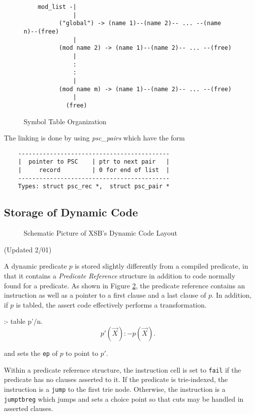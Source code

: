 \documentclass[11pt]{article}
\begin{document}
\begin{figure}
\begin{verbatim}
    mod_list -|
              |
          ("global") -> (name 1)--(name 2)-- ... --(name n)--(free)
              |
          (mod name 2) -> (name 1)--(name 2)-- ... --(free)
              |
              :
              :
              |
          (mod name m) -> (name 1)--(name 2)-- ... --(free)
              |
            (free)
\end{verbatim}
\caption{Symbol Table Organization}
\label{f:pscinmem}
\end{figure}

The linking is done by using {\it psc\_pairs} which have the form

\begin{verbatim}
    -------------------------------------------
    |  pointer to PSC    | ptr to next pair   |
    |     record         | 0 for end of list  |
    -------------------------------------------
    Types: struct psc_rec *,  struct psc_pair *
\end{verbatim}


\subsection{Storage of Dynamic Code}

\begin{figure}[htbp]
\caption{Schematic Picture of XSB's Dynamic Code Layout}
\label{fig:dynamic-code}
\end{figure}

(Updated 2/01)

A dynamic predicate $p$ is stored slightly differently from a compiled
predicate, in that it contains a {\em Predicate Reference} structure
in addition to code normally found for a predicate.  As shown in
Figure \ref{fig:dynamic-code}, the predicate reference contains an
instruction as well as a pointer to a first clause and a last clause
of $p$.  In addition, if $p$ is tabled, the assert code effectively
performs a transformation.
\begin{center}
:- table p'/n.
\[
p'(\vec{X}):- p(\vec{X}). 
\]
\end{center}
and sets the {\tt ep} of $p$ to point to $p'$.

Within a predicate reference structure, the instruction cell is set to
{\tt fail} if the predicate has no clauses asserted to it.  If the
predicate is trie-indexed, the instruction is a {\tt jump} to the
first trie node.  Otherwise, the instruction is a {\tt jumptbreg}
which jumps and sets a choice point so that cuts may be handled in
asserted clauses.
\end{document}
